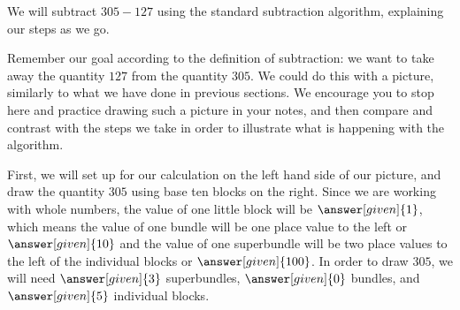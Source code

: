 \documentclass{ximera}
\begin{document}
\begin{example}
We will subtract $305 - 127$ using the standard subtraction algorithm, explaining our steps as we go.

Remember our goal according to the definition of subtraction: we want to take away the quantity $127$ from the quantity $305$. We could do this with a picture, similarly to what we have done in previous sections. We encourage you to stop here and practice drawing such a picture in your notes, and then compare and contrast with the steps we take in order to illustrate what is happening with the algorithm.

First, we will set up for our calculation on the left hand side of our picture, and draw the quantity  $305$ using base ten blocks on the right. Since we are working with whole numbers, the value of one little block will be $\answer[given]{1}$, which means the value of one bundle will be one place value to the left or $\answer[given]{10}$ and the value of one superbundle will be two place values to the left of the individual blocks or $\answer[given]{100}$. In order to draw $305$, we will need $\answer[given]{3}$ superbundles, $\answer[given]{0}$ bundles, and $\answer[given]{5}$ individual blocks.

\begin{image}
\end{image}
\end{example}
\end{document}
